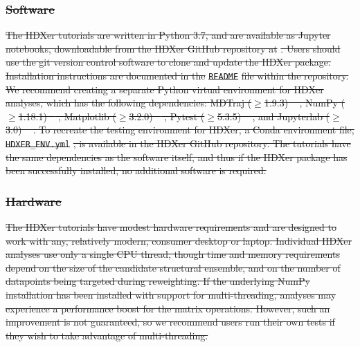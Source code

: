 \documentclass[9pt,tutorial]{livecoms}
\providecommand{\DIFdel}[1]{{\protect\color{red}\sout{#1}}}                      %
\begin{document}
\subsubsection{\DIFdel{Software}}%
\addtocounter{subsubsection}{-1}%
\DIFdel{The HDXer tutorials are written in Python 3.7, and are available as Jupyter notebooks, downloadable from the HDXer GitHub repository at }%
\DIFdel{.
Users should use the git version control software to clone and update the HDXer package. Installation instructions are documented in the }\texttt{\DIFdel{README}} %
\DIFdel{file within the repository.
We recommend creating a separate Python virtual environment for HDXer analyses, which has the following dependencies: MDTraj ($\geqslant$1.9.3) \mbox{%
\cite{McGibbon2015MDTraj}}\hspace{0pt}%
, NumPy ($\geqslant$1.18.1) \mbox{%
\cite{Harris2020}}\hspace{0pt}%
, Matplotlib ($\geqslant$3.2.0) \mbox{%
\cite{Hunter:2007}}\hspace{0pt}%
, Pytest ($\geqslant$5.3.5) \mbox{%
\cite{pytest5.3}}\hspace{0pt}%
, and Jupyterlab ($\geqslant$3.0) \mbox{%
\cite{project_jupyter}}\hspace{0pt}%
.
To recreate the testing environment for HDXer, a Conda environment file, }\texttt{\DIFdel{HDXER\_ENV.yml}}%
\DIFdel{, is available in the HDXer GitHub repository.
The tutorials have the same dependencies as the software itself, and thus if the HDXer package has been successfully installed, no additional software is required.
}%

\subsubsection{\DIFdel{Hardware}}
\addtocounter{subsubsection}{-1}%
\DIFdel{The HDXer tutorials have modest hardware requirements and are designed to work with any, relatively modern, consumer desktop or laptop.
Individual HDXer analyses use only a single CPU thread, though time and memory requirements depend on the size of the candidate structural ensemble, and on the number of datapoints being targeted during reweighting.
If the underlying NumPy installation has been installed with support for multi-threading, analyses may experience a performance boost for the matrix operations.
However, such an improvement is not guaranteed, so we recommend users run their own tests if they wish to take advantage of multi-threading.
}%
\end{document}
